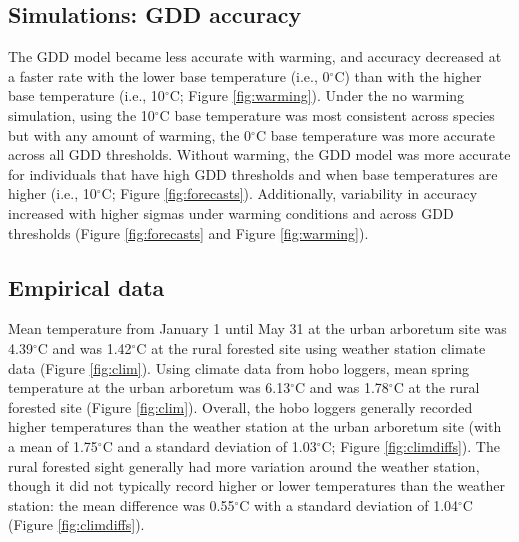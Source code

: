 \documentclass{article}\usepackage[]{graphicx}\usepackage[]{color}
\begin{document}
\subsection*{Simulations: GDD accuracy}
The GDD model became less accurate with warming, and accuracy decreased at a faster rate with the lower base temperature (i.e., 0$^{\circ}$C) than with the higher base temperature (i.e., 10$^{\circ}$C; Figure \ref{fig:warming}). Under the no warming simulation, using the 10$^{\circ}$C base temperature was most consistent across species but with any amount of warming, the 0$^{\circ}$C base temperature was more accurate across all GDD thresholds. Without warming, the GDD model was more accurate for individuals that have high GDD thresholds and when base temperatures are higher (i.e., 10$^{\circ}$C; Figure \ref{fig:forecasts}). Additionally, variability in accuracy increased with higher sigmas under warming conditions and across GDD thresholds (Figure \ref{fig:forecasts} and Figure \ref{fig:warming}).

\subsection*{Empirical data} 
Mean temperature from January 1 until May 31 at the urban arboretum site was 4.39$^{\circ}$C and was 1.42$^{\circ}$C at the rural forested site using weather station climate data (Figure \ref{fig:clim}). Using climate data from hobo loggers, mean spring temperature at the urban arboretum was 6.13$^{\circ}$C and was 1.78$^{\circ}$C at the rural forested site (Figure \ref{fig:clim}). Overall, the hobo loggers generally recorded higher temperatures than the weather station at the urban arboretum site (with a mean of 1.75$^{\circ}$C and a standard deviation of 1.03$^{\circ}$C; Figure \ref{fig:climdiffs}). The rural forested sight generally had more variation around the weather station, though it did not typically record higher or lower temperatures than the weather station: the mean difference was 0.55$^{\circ}$C with a standard deviation of 1.04$^{\circ}$C (Figure \ref{fig:climdiffs}).
\end{document}
